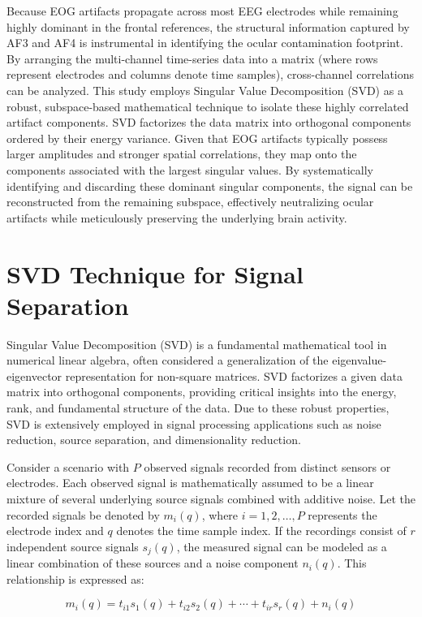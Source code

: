 \documentclass[17pt,a4paper]{extarticle}
\begin{document}
Because EOG artifacts propagate across most EEG electrodes while remaining
highly dominant in the frontal references, the structural information captured by AF3
and AF4 is instrumental in identifying the ocular contamination footprint. By
arranging the multi-channel time-series data into a matrix (where rows represent
electrodes and columns denote time samples), cross-channel correlations can be
analyzed. This study employs Singular Value Decomposition (SVD) as a robust,
subspace-based mathematical technique to isolate these highly correlated artifact
components. SVD factorizes the data matrix into orthogonal components ordered by
their energy variance. Given that EOG artifacts typically possess larger amplitudes
and stronger spatial correlations, they map onto the components associated with
the largest singular values. By systematically identifying and discarding these
dominant singular components, the signal can be reconstructed from the remaining
subspace, effectively neutralizing ocular artifacts while meticulously preserving the
underlying brain activity.

\section{SVD Technique for Signal Separation}

Singular Value Decomposition (SVD) is a fundamental mathematical tool in numerical
linear algebra, often considered a generalization of the eigenvalue-eigenvector
representation for non-square matrices. SVD factorizes a given data matrix into
orthogonal components, providing critical insights into the energy, rank, and
fundamental structure of the data. Due to these robust properties, SVD is
extensively employed in signal processing applications such as noise reduction,
source separation, and dimensionality reduction.

Consider a scenario with $P$ observed signals recorded from distinct sensors or
electrodes. Each observed signal is mathematically assumed to be a linear mixture
of several underlying source signals combined with additive noise. Let the recorded
signals be denoted by $m_i(q)$, where $i = 1, 2, \ldots, P$ represents the electrode index
and $q$ denotes the time sample index. If the recordings consist of $r$ independent
source signals $s_j(q)$, the measured signal can be modeled as a linear combination of
these sources and a noise component $n_i(q)$. This relationship is expressed as:

\[
m_i(q) = t_{i1}s_1(q) + t_{i2}s_2(q) + \cdots + t_{ir}s_r(q) + n_i(q)
\]
\end{document}
